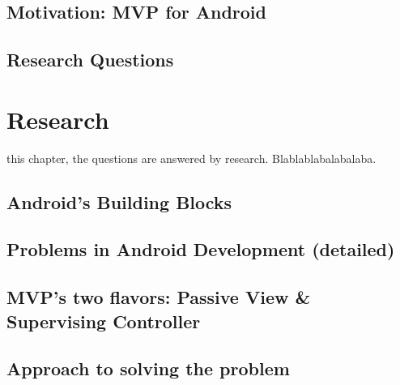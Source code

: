 	\subsection{Motivation: MVP for Android}
	
	\subsection{Research Questions}
	
\section{Research}

 this chapter, the questions are answered by research. Blablablabalabalaba.

	\subsection{Android's Building Blocks}
	
	\subsection{Problems in Android Development (detailed)}
	
	\subsection{MVP's two flavors: Passive View \& Supervising Controller}
	
	\subsection{Approach to solving the problem}
	
	